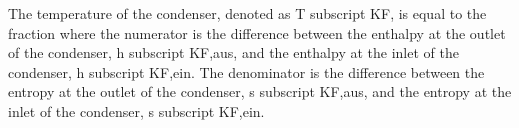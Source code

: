 The temperature of the condenser, denoted as T subscript KF, is equal to the fraction where the numerator is the difference between the enthalpy at the outlet of the condenser, h subscript KF,aus, and the enthalpy at the inlet of the condenser, h subscript KF,ein. The denominator is the difference between the entropy at the outlet of the condenser, s subscript KF,aus, and the entropy at the inlet of the condenser, s subscript KF,ein.